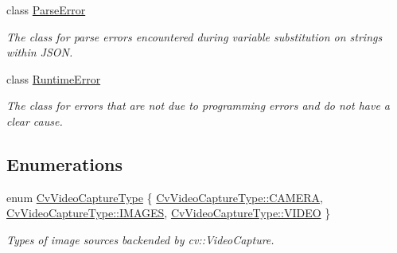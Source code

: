 \begin{DoxyCompactItemize}
class \hyperlink{classstereo__ugv_1_1ParseError}{Parse\+Error}
\begin{DoxyCompactList}\small\item\em The class for parse errors encountered during variable substitution on strings within J\+S\+ON. \end{DoxyCompactList}\item 
class \hyperlink{classstereo__ugv_1_1RuntimeError}{Runtime\+Error}
\begin{DoxyCompactList}\small\item\em The class for errors that are not due to programming errors and do not have a clear cause. \end{DoxyCompactList}\end{DoxyCompactItemize}
\subsection*{Enumerations}
\begin{DoxyCompactItemize}
\item 
enum \hyperlink{namespacestereo__ugv_a5c139e7cfac12e9270ca903f1ce2e4bc}{Cv\+Video\+Capture\+Type} \{ \hyperlink{namespacestereo__ugv_a5c139e7cfac12e9270ca903f1ce2e4bcaddf0d6b21537d984fea6544f58101fa8}{Cv\+Video\+Capture\+Type\+::\+C\+A\+M\+E\+RA}, 
\hyperlink{namespacestereo__ugv_a5c139e7cfac12e9270ca903f1ce2e4bcab34687a3607271050f02aa9bf90c731a}{Cv\+Video\+Capture\+Type\+::\+I\+M\+A\+G\+ES}, 
\hyperlink{namespacestereo__ugv_a5c139e7cfac12e9270ca903f1ce2e4bcae60ae31f67ab883c746bb71c7a145c18}{Cv\+Video\+Capture\+Type\+::\+V\+I\+D\+EO}
 \}\begin{DoxyCompactList}\small\item\em Types of image sources backended by cv\+::\+Video\+Capture. \end{DoxyCompactList}
\end{DoxyCompactItemize}
